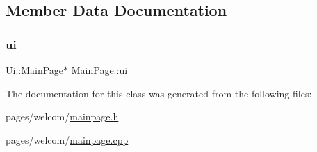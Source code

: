 \subsection{Member Data Documentation}
\mbox{\label{class_main_page_a06cf83c45e3c018adf7409c4a296d9f4}} 
\subsubsection{\texorpdfstring{ui}{ui}}
{\footnotesize\ttfamily Ui\+::\+Main\+Page$\ast$ Main\+Page\+::ui\hspace{0.3cm}{\ttfamily [private]}}



The documentation for this class was generated from the following files\+:\begin{DoxyCompactItemize}
\item 
pages/welcom/\mbox{\hyperlink{mainpage_8h}{mainpage.\+h}}\item 
pages/welcom/\mbox{\hyperlink{mainpage_8cpp}{mainpage.\+cpp}}\end{DoxyCompactItemize}
